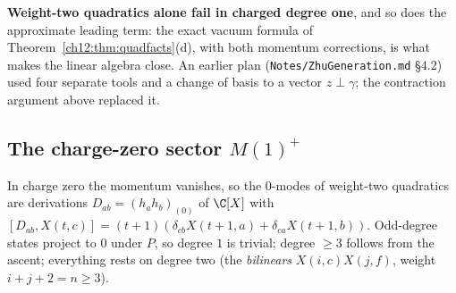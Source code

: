 \begin{warning}
\textbf{Weight-two quadratics alone fail in charged degree one}, and so does the approximate leading
term: the exact vacuum formula of Theorem~\ref{ch12:thm:quadfacts}(d), with both momentum
corrections, is what makes the linear algebra close.  An earlier plan (\texttt{Notes/ZhuGeneration.md}
§4.2) used four separate tools and a change of basis to a vector $z\perp\gamma$; the contraction
argument above replaced it.
\end{warning}

\subsection{The charge-zero sector \texorpdfstring{$M(1)^+$}{M(1)+}}

In charge zero the momentum vanishes, so the $0$-modes of weight-two quadratics are derivations
$D_{ab}=(h_ah_b)_{(0)}$ of $\C[X]$ with $[D_{ab},X(t,c)]=(t+1)(\delta_{cb}X(t+1,a)+\delta_{ca}X(t+1,b))$.
Odd-degree states project to $0$ under $P$, so degree $1$ is trivial; degree $\ge3$ follows from the
ascent; everything rests on degree two (the \emph{bilinears} $X(i,c)X(j,f)$, weight $i+j+2=n\ge3$).

